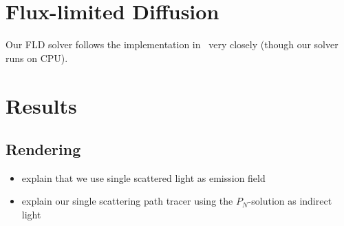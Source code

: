 
\section{Flux-limited Diffusion}
\label{sec:vef}

Our FLD solver follows the implementation in~\cite{Koerner14} very closely (though our solver runs on CPU).

\section{Results}
\label{sec:results}

\subsection{Rendering}

\begin{itemize}
	\item explain that we use single scattered light as emission field
	\item explain our single scattering path tracer using the $P_N$-solution as indirect light
\end{itemize}

